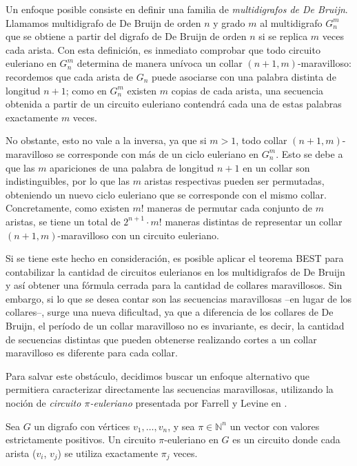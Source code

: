 \documentclass[11pt]{article}
\begin{document}
Un enfoque posible consiste en definir una familia de \emph{multidigrafos de De
	Bruijn}.
Llamamos multidigrafo de De Bruijn de orden $n$ y grado $m$ al multidigrafo
$G_n^m$ que se obtiene a partir del digrafo de De Bruijn de orden $n$ si se
replica $m$ veces cada arista.
Con esta definición, es inmediato comprobar que todo circuito euleriano en
$G_n^m$ determina de manera unívoca un collar $(n+1, m)$-maravilloso:
recordemos que cada arista de $G_n$ puede asociarse con una palabra distinta de
longitud $n+1$; como en $G_n^m$ existen $m$ copias de cada arista, una
secuencia obtenida a partir de un circuito euleriano contendrá cada una de
estas palabras exactamente $m$ veces.

No obstante, esto no vale a la inversa, ya que si $m > 1$, todo collar
$(n+1,m)$-maravilloso se corresponde con más de un ciclo euleriano en $G_n^m$.
Esto se debe a que las $m$ apariciones de una palabra de longitud $n + 1$ en un
collar son indistinguibles, por lo que las $m$ aristas respectivas pueden ser
permutadas, obteniendo un nuevo ciclo euleriano que se corresponde con el mismo
collar.
Concretamente, como existen $m! $ maneras de permutar cada conjunto de $m$
aristas, se tiene un total de $2^{n+1} \cdot m!$ maneras distintas de
representar un collar $(n+1,m)$-maravilloso con un circuito euleriano.

Si se tiene este hecho en consideración, es posible aplicar el teorema BEST
para contabilizar la cantidad de circuitos eulerianos en los multidigrafos de
De Bruijn y así obtener una fórmula cerrada para la cantidad de collares
maravillosos.
Sin embargo, si lo que se desea contar son las secuencias maravillosas --en
lugar de los collares--, surge una nueva dificultad, ya que a diferencia de los
collares de De Bruijn, el período de un collar maravilloso no es invariante, es
decir, la cantidad de secuencias distintas que pueden obtenerse realizando
cortes a un collar maravilloso es diferente para cada collar.

Para salvar este obstáculo, decidimos buscar un enfoque alternativo que
permitiera caracterizar directamente las secuencias maravillosas, utilizando la
noción de \emph{circuito $\pi$-euleriano} presentada por Farrell y Levine en
\cite{Farrell_Levine_2016}.

\begin{defi}
	Sea $G$ un digrafo con vértices $v_1, \dots, v_n$, y sea $\pi \in
		\mathbb{N}^n$
	un vector con valores estrictamente positivos.
	Un circuito $\pi$-euleriano en $G$ es un circuito donde cada arista
	($v_i$, $v_j$) se utiliza exactamente $\pi_j$ veces.
\end{defi}
\end{document}
